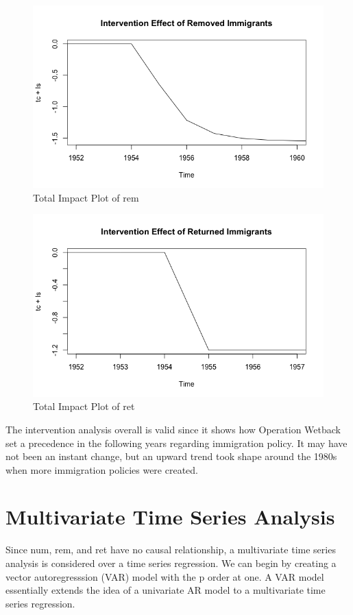 \documentclass[a4paper]{article}
\begin{document}
\begin{figure}[h!]
\centering
\includegraphics[scale=0.4]{images/int_rem}
\caption{Total Impact Plot of rem}
\label{fig:int_rem}
\end{figure}

\begin{figure}[h!]
\centering
\includegraphics[scale=0.4]{images/int_ret.png}
\caption{Total Impact Plot of ret}
\label{fig:int_ret}
\end{figure}

The intervention analysis overall is valid since it shows how Operation Wetback set a precedence in the following years regarding immigration policy. It may have not been an instant change, but an upward trend took shape around the 1980s when more immigration policies were created.

\section{Multivariate Time Series Analysis}
Since num, rem, and ret have no causal relationship, a multivariate time series analysis is considered over a time series regression. We can begin by creating a vector autoregresssion (VAR) model with the p order at one. A VAR model essentially extends the idea of a univariate AR model to a multivariate time series regression. \\
\end{document}
